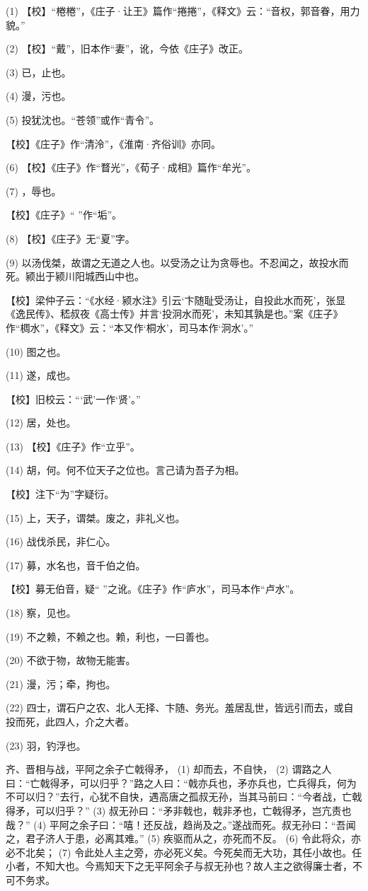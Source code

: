 \documentclass[12pt,UTF8]{ctexbook}
\begin{document}
(1) 【校】“棬棬”，《庄子·让王》篇作“捲捲”，《释文》云：“音权，郭音眷，用力貌。”

(2) 【校】“戴”，旧本作“妻”，讹，今依《庄子》改正。

(3) 已，止也。

(4) 漫，污也。

(5) 投犹沈也。“苍领”或作“青令”。

【校】《庄子》作“清泠”，《淮南·齐俗训》亦同。

(6) 【校】《庄子》作“瞀光”，《荀子·成相》篇作“牟光”。

(7) ，辱也。

【校】《庄子》“ ”作“垢”。

(8) 【校】《庄子》无“夏”字。

(9) 以汤伐桀，故谓之无道之人也。以受汤之让为贪辱也。不忍闻之，故投水而死。颍出于颍川阳城西山中也。

【校】梁仲子云：“《水经·颍水注》引云‘卞随耻受汤让，自投此水而死’，张显《逸民传》、嵇叔夜《高士传》并言‘投泂水而死’，未知其孰是也。”案《庄子》作“椆水”，《释文》云：“本又作‘桐水’，司马本作‘泂水’。”

(10) 图之也。

(11) 遂，成也。

【校】旧校云：“‘武’一作‘贤’。”

(12) 居，处也。

(13) 【校】《庄子》作“立乎”。

(14) 胡，何。何不位天子之位也。言己请为吾子为相。

【校】注下“为”字疑衍。

(15) 上，天子，谓桀。废之，非礼义也。

(16) 战伐杀民，非仁心。

(17) 募，水名也，音千伯之伯。

【校】募无伯音，疑“ ”之讹。《庄子》作“庐水”，司马本作“卢水”。

(18) 察，见也。

(19) 不之赖，不赖之也。赖，利也，一曰善也。

(20) 不欲于物，故物无能害。

(21) 漫，污；牵，拘也。

(22) 四士，谓石户之农、北人无择、卞随、务光。羞居乱世，皆远引而去，或自投而死，此四人，介之大者。

(23) 羽，钓浮也。

齐、晋相与战，平阿之余子亡戟得矛， (1) 却而去，不自快， (2) 谓路之人曰：“亡戟得矛，可以归乎？”路之人曰：“戟亦兵也，矛亦兵也，亡兵得兵，何为不可以归？”去行，心犹不自快，遇高唐之孤叔无孙，当其马前曰：“今者战，亡戟得矛，可以归乎？” (3) 叔无孙曰：“矛非戟也，戟非矛也，亡戟得矛，岂亢责也哉？” (4) 平阿之余子曰：“嘻！还反战，趋尚及之。”遂战而死。叔无孙曰：“吾闻之，君子济人于患，必离其难。” (5) 疾驱而从之，亦死而不反。 (6) 令此将众，亦必不北矣； (7) 令此处人主之旁，亦必死义矣。今死矣而无大功，其任小故也。任小者，不知大也。今焉知天下之无平阿余子与叔无孙也？故人主之欲得廉士者，不可不务求。
\end{document}
